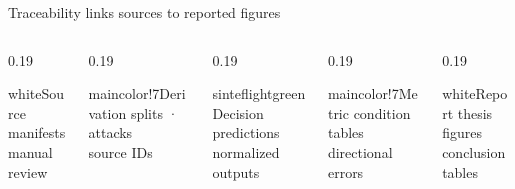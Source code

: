 \documentclass{beamer}
\begin{document}
\begin{frame}{Traceability links sources to reported figures}
\vspace{0.25cm}
\begin{columns}[T,totalwidth=\textwidth]
  \begin{column}{0.19\textwidth}
    \begin{colorblock}[black]{white}{Source}
      \centering\scriptsize manifests\\manual review
    \end{colorblock}
  \end{column}
  \begin{column}{0.19\textwidth}
    \begin{colorblock}[black]{maincolor!7}{Derivation}
      \centering\scriptsize splits · attacks\\source IDs
    \end{colorblock}
  \end{column}
  \begin{column}{0.19\textwidth}
    \begin{colorblock}[black]{sinteflightgreen}{Decision}
      \centering\scriptsize predictions\\normalized outputs
    \end{colorblock}
  \end{column}
  \begin{column}{0.19\textwidth}
    \begin{colorblock}[black]{maincolor!7}{Metric}
      \centering\scriptsize condition tables\\directional errors
    \end{colorblock}
  \end{column}
  \begin{column}{0.19\textwidth}
    \begin{colorblock}[black]{white}{Report}
      \centering\scriptsize thesis figures\\conclusion tables
    \end{colorblock}
  \end{column}
\end{columns}


\end{frame}
\end{document}
